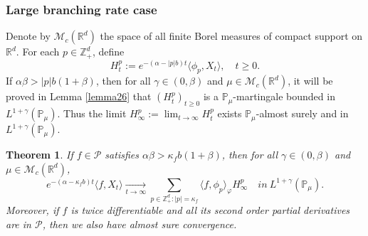 \documentclass[12pt,a4paper]{amsart}
\theoremstyle{plain}
\newtheorem{thm}{Theorem}[section]
\theoremstyle{definition}
\newtheorem{rem}[thm]{Remark}
\numberwithin{equation}{section}
\begin{document}
\subsubsection{Large branching rate case}
    Denote by $\mathcal M_c(\mathbb R^d)$ the space of all finite Borel measures of compact support on $\mathbb R^d$.
    For each $p\in \mathbb{Z}_+^d$, define
\[
    H_t^p
    := e^{-(\alpha-|p|b)t}\langle\phi_p,X_t\rangle,
    \quad t\geq 0.
\]
    If $\alpha\beta>|p|b(1+\beta)$, then for all $\gamma\in (0, \beta)$ and $\mu\in \mathcal M_c(\mathbb R^d)$, 
    it will be proved in Lemma \ref{lemma26} that $(H_t^p)_{t\geq 0}$ is a $\mathbb{P}_{\mu}$-martingale bounded in $L^{1+\gamma}(\mathbb{P}_{\mu})$.
    Thus the limit $H^p_{\infty}:=\lim_{t\rightarrow \infty}H_t^p$ exists $\mathbb{P}_{\mu}$-almost surely and in $L^{1+\gamma}(\mathbb{P}_{\mu})$.
 \begin{thm}\label{Theorem11}
     If $f \in \mathcal{P}$ satisfies $\alpha\beta>\kappa_fb(1+\beta)$, then for all $\gamma\in (0, \beta)$ and  $\mu\in \mathcal M_c(\mathbb R^d)$, %
\[
    e^{-(\alpha-\kappa_fb)t}\langle f, X_t\rangle 
    \xrightarrow[t\to \infty]{}\sum_{p\in \mathbb Z_+^d:|p|=\kappa_f}\langle f, \phi_p\rangle_{\varphi} H_{\infty}^p
    \quad in~ L^{1+\gamma}(\mathbb{P}_{\mu}).
\]
    Moreover, if $f$ is twice differentiable and all its second order partial derivatives are in $\mathcal{P}$, then we also have almost sure convergence.
\end{thm}
\begin{comment}
    For any $t\geq 0$, let $H_t:=e^{-\alpha t}\|X_t\|$. 
    Then $H_t$ is equal to $H_t^0$ and is a non-negative martingale with limit $H_{\infty}:=\lim_{t\rightarrow\infty}H_t$,  $\mathbb{P}_{\mu}$-a.s. and in $L^{1+\gamma}(\mathbb{P}_{\mu})$, for all $\gamma\in (0, \beta)$ and $\mu\in \mathcal M_c(\mathbb R^d)$.
\begin{rem}
    Let $f \in \mathcal{P}$.  If $\kappa_f=0$, $\langle f, \phi_{\kappa_f}\rangle_{\varphi}$ reduces to $\langle f, 1\rangle_\phi=\langle f,\varphi\rangle$. 
    Hence by Theorem \ref{Theorem11}, for all $\gamma\in (0, \beta)$ and  $\mu\in \mathcal M_c(\mathbb R^d)$, as $t\rightarrow \infty$,
\[
    e^{-\alpha t}\langle f, X_t\rangle 
    \rightarrow \langle f, \varphi\rangle H_{\infty} 
    \quad in~ L^{1+\gamma}(\mathbb{P}_{\mu}).
\]
    Moreover, if $f$ is twice differentiable and all its second order partial derivatives are in $\mathcal{P}$, then we also have almost sure convergence.
 \end{rem}
\end{comment}
\end{document}
